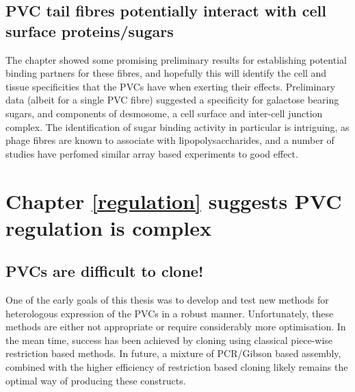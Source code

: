 \subsection{PVC tail fibres potentially interact with cell surface proteins/sugars}
The chapter showed some promising preliminary results for establishing potential binding partners for these fibres, and hopefully this will identify the cell and tissue specificities that the PVCs have when exerting their effects. Preliminary data (albeit for a single PVC fibre) suggested a specificity for galactose bearing sugars, and components of desmosome, a cell surface and inter-cell junction complex. The identification of sugar binding activity in particular is intriguing, as phage fibres are known to associate with lipopolysaccharides, and a number of studies have perfomed similar array based experiments to good effect.


\section{Chapter \ref{regulation} suggests PVC regulation is complex}
\subsection{PVCs are difficult to clone!}
One of the early goals of this thesis was to develop and test new methods for heterologous expression of the PVCs in a robust manner. Unfortunately, these methods are either not appropriate or require considerably more optimisation. In the mean time, success has been achieved by cloning using classical piece-wise restriction based methods. In future, a mixture of PCR/Gibson based assembly, combined with the higher efficiency of restriction based cloning likely remains the optimal way of producing these constructs.

